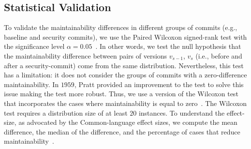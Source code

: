 \documentclass[smallextended]{svjour3}       %
\begin{document}
%
%
%
%

\subsection{Statistical Validation}\label{sec:statsval}
%
To validate the maintainability differences in different groups of 
commits (e.g., baseline and security commits), we use the Paired 
Wilcoxon signed-rank test with the significance level $\alpha = 
0.05$~\cite{10.2307/3001968}. In other words, we test the null 
hypothesis that the maintainability difference between pairs of 
versions $v_{s-1}$, $v_s$ (i.e., before and after a security-commit) 
come from the same distribution. Nevertheless, this test 
has a limitation: it does not consider the groups of commits with a 
zero-difference maintainability. In $1959$, Pratt provided an 
improvement to the test to solve this issue making the test more 
robust. Thus, we use a version of the Wilcoxon test that 
incorporates the cases where maintainability is equal to 
zero~\cite{10.2307/2282543}. The Wilcoxon test requires a 
distribution size of at least $20$ instances. To understand the 
effect-size, as advocated by the Common-language effect 
sizes, we compute the mean difference, the median of 
the difference, and the percentage of cases that reduce 
maintainability~\cite{graw:1992}.
%
\end{document}
